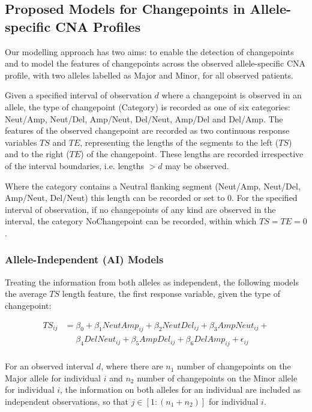 \subsection{Proposed Models for Changepoints in Allele-specific CNA Profiles} \label{models}
Our modelling approach has two aims: to enable the detection of changepoints and to model the features of changepoints across the observed allele-specific CNA profile, with two alleles labelled as Major and Minor, for all observed patients. 

Given a specified interval of observation $d$ where a changepoint is observed in an allele, the type of changepoint (Category) is recorded as one of six categories: Neut/Amp, Neut/Del, Amp/Neut, Del/Neut, Amp/Del and Del/Amp. The features of the observed changepoint are recorded as two continuous response variables $TS$ and $TE$, representing the lengths of the segments to the left ($TS$) and to the right ($TE$) of the changepoint. These lengths are recorded irrespective of the interval boundaries, i.e. lengths $>d$ may be observed. 

Where the category contains a Neutral flanking segment (Neut/Amp, Neut/Del, Amp/Neut, Del/Neut) this length can be recorded or set to 0. For the specified interval of observation, if no changepoints of any kind are observed in the interval, the category NoChangepoint can be recorded, within which $TS=TE=0$.

\subsubsection{Allele-Independent (AI) Models} \label{Model1}
Treating the information from both alleles as independent, the following models the average $TS$ length feature, the first response variable, given the type of changepoint: 

\begin{equation}
\begin{aligned}
TS_{ij}&=\beta_0+ \beta_1 NeutAmp_{ij} + \beta_2NeutDel_{ij}+ \beta_3AmpNeut_{ij} +  \\
       & \mathrel{\phantom{=}} \beta_4DelNeut_{ij}+ \beta_5AmpDel_{ij} + \beta_6DelAmp_{ij} + \epsilon_{ij}\\
\end{aligned}
\label{Eq1}
\end{equation}

For an observed interval $d$, where there are $n_1$ number of changepoints on the Major allele for individual $i$ and $n_2$ number of changepoints on the Minor allele for individual $i$, the information on both alleles for an individual are included as independent observations, so that $j\in [1: (n_1+n_2)]$ for individual $i$.

